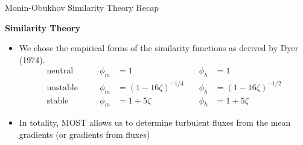 \begin{frame}{Monin-Obukhov Similarity Theory Recap}

\textbf{Similarity Theory}
\begin{itemize}
	\item We chose the empirical forms of the similarity functions as derived by Dyer (1974).
	\begin{align*}
		\text{neutral} & \quad & \phi_m &= 1 & \quad  \phi_h &= 1\\
		\text{unstable} & \quad & \phi_m &= \left(1 - 16\zeta\right)^{-1/4} & \quad  \phi_h &= \left(1 - 16\zeta\right)^{-1/2}\\
		\text{stable} & \quad & \phi_m &= 1 + 5\zeta & \quad  \phi_h &= 1 + 5\zeta
		\end{align*}
		\item In totality, MOST allows us to determine turbulent fluxes from the mean gradients (or gradients from fluxes)
\end{itemize}
\end{frame}
